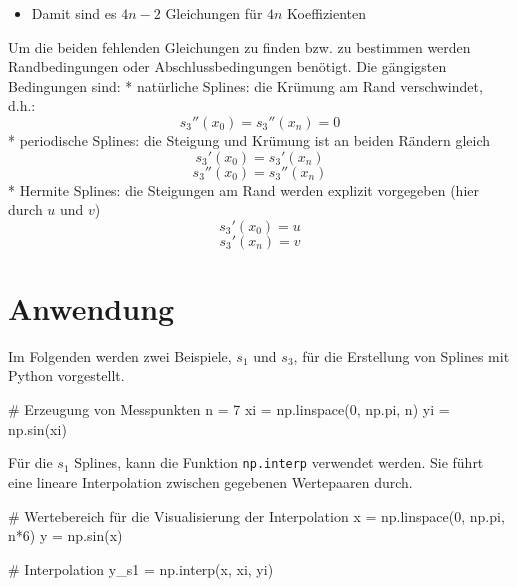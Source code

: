 \documentclass[
  letterpaper,
  DIV=11,
  numbers=noendperiod]{scrreprt}
\newenvironment{Shaded}{\begin{snugshade}}{\end{snugshade}}
\newcommand{\CommentTok}[1]{\textcolor[rgb]{0.37,0.37,0.37}{#1}}
\newcommand{\DecValTok}[1]{\textcolor[rgb]{0.68,0.00,0.00}{#1}}
\newcommand{\NormalTok}[1]{\textcolor[rgb]{0.00,0.23,0.31}{#1}}
\newcommand{\OperatorTok}[1]{\textcolor[rgb]{0.37,0.37,0.37}{#1}}
\providecommand{\tightlist}{%
  \setlength{\itemsep}{0pt}\setlength{\parskip}{0pt}}\usepackage{longtable,booktabs,array}
\begin{document}
\begin{itemize}
\tightlist
\item
  Damit sind es \(4n − 2\) Gleichungen für \(4n\) Koeffizienten
\end{itemize}

Um die beiden fehlenden Gleichungen zu finden bzw. zu bestimmen werden
Randbedingungen oder Abschlussbedingungen benötigt. Die gängigsten
Bedingungen sind: * natürliche Splines: die Krümung am Rand
verschwindet, d.h.: \[ s_3''(x_0) = s_3''(x_n) = 0 \] * periodische
Splines: die Steigung und Krümung ist an beiden Rändern gleich
\[ s_3'(x_0) = s_3'(x_n)\] \[ s_3''(x_0) = s_3''(x_n)\] * Hermite
Splines: die Steigungen am Rand werden explizit vorgegeben (hier durch
\(u\) und \(v\)) \[ s_3'(x_0) = u \] \[ s_3'(x_n) = v \]

\section{Anwendung}\label{anwendung}

Im Folgenden werden zwei Beispiele, \(s_1\) und \(s_3\), für die
Erstellung von Splines mit Python vorgestellt.

\begin{Shaded}
\begin{Highlighting}[]
\CommentTok{\# Erzeugung von Messpunkten}
\NormalTok{n }\OperatorTok{=} \DecValTok{7}
\NormalTok{xi }\OperatorTok{=}\NormalTok{ np.linspace(}\DecValTok{0}\NormalTok{, np.pi, n)}
\NormalTok{yi }\OperatorTok{=}\NormalTok{ np.sin(xi)}
\end{Highlighting}
\end{Shaded}

Für die \(s_1\) Splines, kann die Funktion \texttt{np.interp} verwendet
werden. Sie führt eine lineare Interpolation zwischen gegebenen
Wertepaaren durch.

\begin{Shaded}
\begin{Highlighting}[]
\CommentTok{\# Wertebereich für die Visualisierung der Interpolation}
\NormalTok{x }\OperatorTok{=}\NormalTok{ np.linspace(}\DecValTok{0}\NormalTok{, np.pi, n}\OperatorTok{*}\DecValTok{6}\NormalTok{)}
\NormalTok{y }\OperatorTok{=}\NormalTok{ np.sin(x)}
\end{Highlighting}
\end{Shaded}

\begin{Shaded}
\begin{Highlighting}[]
\CommentTok{\# Interpolation}
\NormalTok{y\_s1 }\OperatorTok{=}\NormalTok{ np.interp(x, xi, yi)}
\end{Highlighting}
\end{Shaded}
\end{document}
